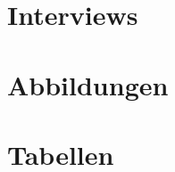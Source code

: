 \newpage

\begin{appendix}

	\section{Interviews}\label{Interviews_Anhang}
	
	\newpage
	
	\newpage	

	\section{Abbildungen}
	
	\newpage	
	\section{Tabellen}
	
	\newpage
	
\end{appendix}